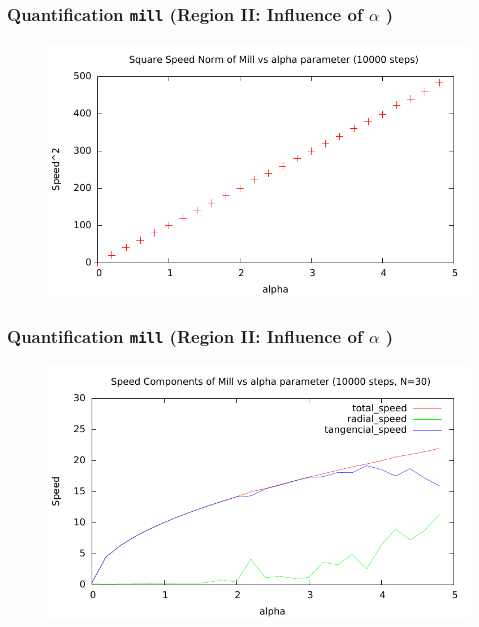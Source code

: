 \documentclass[compress]{beamer}
\begin{document}
\begin{frame}
	\frametitle{Quantification \texttt{mill} \small (Region II: Influence of \( \alpha \) )} \normalsize
	\begin{figure}[H]
		\includegraphics[width=1. \columnwidth]{../plots/mill_II_square_alpha_10000.pdf}
	\end{figure}
\end{frame}


\begin{frame}
	\frametitle{Quantification \texttt{mill} \small (Region II: Influence of \( \alpha \) )} \normalsize	
	\begin{figure}[H]
		\includegraphics[width=1. \columnwidth]{../plots/mill_II_speeds_alpha_10000.pdf}
	\end{figure}	
\end{frame}
\end{document}
